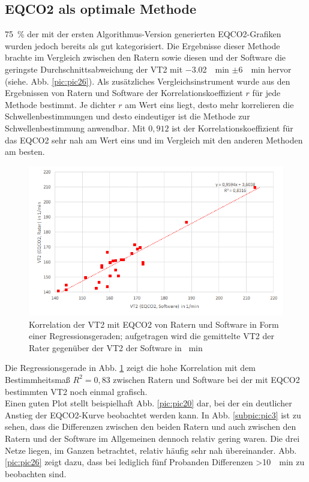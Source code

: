 \subsection{\gls{EQCO2} als optimale Methode}
%
75~\% der mit der ersten Algorithmus-Version generierten \gls{EQCO2}-Grafiken wurden jedoch bereits als gut kategorisiert. Die Ergebnisse dieser Methode brachte im Vergleich zwischen den Ratern sowie diesen und der Software die geringste Durchschnittsabweichung der VT2 mit \SI{-3,02}{\per\minute} $\pm$\SI{6}{\per\minute} hervor (siehe. Abb. \ref{pic:pic26}). Als zusätzliches Vergleichsinstrument wurde aus den Ergebnissen von Ratern und Software der Korrelationskoeffizient $r$ für jede Methode bestimmt. Je dichter $r$ am Wert eins liegt, desto mehr korrelieren die Schwellenbestimmungen und desto eindeutiger ist die Methode zur Schwellenbestimmung anwendbar. Mit $0,912$ ist der Korrelationskoeffizient für das \gls{EQCO2} sehr nah am Wert eins und im Vergleich mit den anderen Methoden am besten.
%
\begin{figure}[H]
	\centering
	\includegraphics[scale=0.7]{Bilder/r_eqco2}
	\caption[Korrelation der \gls{EQCO2}-Werte von Ratern und Software]{Korrelation der VT2 mit \gls{EQCO2} von Ratern und Software in Form einer Regressionsgeraden; aufgetragen wird die gemittelte VT2 der Rater gegenüber der VT2 der Software in \si{\per\minute}}
	\label{pic:pic28}
\end{figure}
%
Die Regressionsgerade in Abb. \ref{pic:pic28} zeigt die hohe Korrelation mit dem Bestimmheitsmaß $R^2 = 0,83$ zwischen Ratern und Software bei der mit \gls{EQCO2} bestimmten VT2 noch einmal grafisch.\\
Einen guten Plot stellt beispielhaft Abb. \ref{pic:pic20} dar, bei der ein deutlicher Anstieg der \gls{EQCO2}-Kurve beobachtet werden kann. In Abb. \ref{subpic:pic3} ist zu sehen, dass die Differenzen zwischen den beiden Ratern und auch zwischen den Ratern und der Software im Allgemeinen dennoch relativ gering waren. Die drei Netze liegen, im Ganzen betrachtet, relativ häufig sehr nah übereinander. Abb. \ref{pic:pic26} zeigt dazu, dass bei lediglich fünf Probanden Differenzen >\SI{10}{\per\minute} zu beobachten sind.\\
